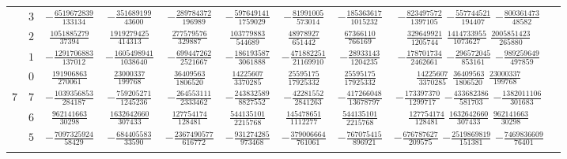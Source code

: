 \begin{table}
\begin{center}
\begin{tabular}{cccccccccc}
           &  $3$  &  $-\frac{  6519672839}{ 133134}$  &  $-\frac{   351689199}{  43600}$  &  $-\frac{  289784372}{  196989}$  &  $-\frac{ 597649141}{ 1759029}$  &  $-\frac{  81991005}{  573014}$  &  $-\frac{ 185363617}{ 1015232}$  &  $-\frac{  823497572}{ 1397105}$  $-\frac{   557744521}{ 194407}$  $-\frac{   800361473}{  48582}$  \\ \addlinespace
           &  $2$  &  $ \frac{  1051885279}{  37394}$  &  $ \frac{  1919279425}{ 414313}$  &  $ \frac{  277579576}{  329887}$  &  $ \frac{ 103779883}{  544689}$  &  $ \frac{  48978927}{  651442}$  &  $ \frac{  67366110}{  766169}$  &  $ \frac{  329649921}{ 1205744}$  $ \frac{  1414733955}{1073627}$  $ \frac{  2005851423}{ 265880}$  \\ \addlinespace
           &  $1$  &  $-\frac{  1291706883}{ 137012}$  &  $-\frac{  1605498941}{1038640}$  &  $-\frac{  699447262}{ 2521667}$  &  $-\frac{ 186193587}{ 3061888}$  &  $-\frac{ 471882251}{21169910}$  &  $-\frac{  28933143}{ 1204235}$  &  $-\frac{  178701734}{ 2462661}$  $-\frac{   296572045}{ 853161}$  $-\frac{   989259649}{ 497859}$  \\ \addlinespace
           &  $0$  &  $ \frac{   191906863}{ 270061}$  &  $ \frac{    23000337}{ 199768}$  &  $ \frac{   36409563}{ 1806520}$  &  $ \frac{  14225607}{ 3370285}$  &  $ \frac{  25595175}{17925332}$  &  $ \frac{  25595175}{17925332}$  &  $ \frac{   14225607}{ 3370285}$  $ \frac{    36409563}{1806520}$  $ \frac{    23000337}{ 199768}$  \\ \addlinespace
      $7$  &  $7$  &  $-\frac{  1039356853}{ 284187}$  &  $-\frac{   759205271}{1245236}$  &  $-\frac{  264553111}{ 2333462}$  &  $-\frac{ 243832589}{ 8827552}$  &  $-\frac{  42281552}{ 2841263}$  &  $-\frac{ 417266048}{13678797}$  &  $-\frac{  173397370}{ 1299717}$  $-\frac{   433682386}{ 581703}$  $-\frac{  1382011106}{ 301683}$  \\ \addlinespace
           &  $6$  &  $ \frac{   962141663}{  30298}$  &  $ \frac{  1632642660}{ 307433}$  &  $ \frac{  127754174}{  128481}$  &  $ \frac{ 544135101}{ 2215768}$  &  $ \frac{ 145478651}{ 1112277}$  &  $ \frac{ 544135101}{ 2215768}$  &  $ \frac{  127754174}{  128481}$  $ \frac{  1632642660}{ 307433}$  $ \frac{   962141663}{  30298}$  \\ \addlinespace
           &  $5$  &  $-\frac{  7097325924}{  58429}$  &  $-\frac{   684405583}{  33590}$  &  $-\frac{ 2367490577}{  616772}$  &  $-\frac{ 931274285}{  973468}$  &  $-\frac{ 379006664}{  761061}$  &  $-\frac{ 767075415}{  896921}$  &  $-\frac{  676787627}{  209575}$  $-\frac{  2519869819}{ 151381}$  $-\frac{  7469836609}{  76401}$  \\ \addlinespace

\end{tabular}
\end{center}
\end{table}
